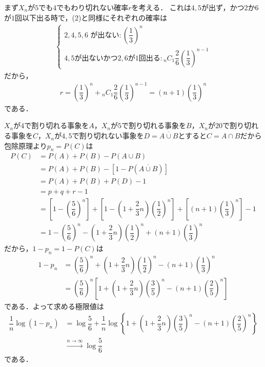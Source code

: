 \documentclass[../../main.tex]{subfiles}
\begin{document}
まず$X_n$が$5$でも$4$でもわり切れない確率$r$を考える．
これは$4, 5$が出ず，かつ$2$か$6$が$1$回以下出る時で，(2)と同様にそれぞれの確率は
\begin{align}
  \begin{cases}
    \text{$2, 4, 5, 6$ が出ない}: \left(\dfrac{1}{3}\right)^n \\
    \text{$4,5$が出ないかつ$2,6$が1回出る}: {}_n C_1 \dfrac{2}{6} \left(\dfrac{1}{3}\right)^{n-1}
  \end{cases}
\end{align}
だから，
\begin{align}
  r = \left(\dfrac{1}{3}\right)^n + {}_n C_1 \dfrac{2}{6} \left(\dfrac{1}{3}\right)^{n-1}
  = (n+1)\left(\dfrac{1}{3}\right)^n \label{eq:3}
\end{align}
である．

$X_n$が$4$で割り切れる事象を$A$，$X_n$が$5$で割り切れる事象を$B$，$X_n$が$20$で割り切れる事象を$C$，$X_n$が$4,5$で割り切れない事象を$D=\overline{A\cup B}$とすると$C=A\cap B$だから包除原理より$p_n=P(C)$は
\begin{align}
  P(C)
  &= P(A)+P(B)-P(A\cup B) \\
  &= P(A)+P(B)-\left[1-P(\overline{A\cup B})\right] \\
  &= P(A)+P(B)+P(D)-1 \\
  &= p+q+r-1 \\
  &= \left[1 - \left(\dfrac{5}{6}\right)^n\right]
  + \left[1 - \left(1+\dfrac{2}{3}n\right)\left(\dfrac{1}{2}\right)^n\right]
  + \left[(n+1)\left(\dfrac{1}{3}\right)^n\right]
  - 1 \\
  &= 1 - \left(\dfrac{5}{6}\right)^n - \left(1+\dfrac{2}{3}n\right)\left(\dfrac{1}{2}\right)^n + (n+1)\left(\dfrac{1}{3}\right)^n
\end{align}
だから，$1-p_n=1-P(C)$は
\begin{align}
  1-p_n
  &= \left(\dfrac{5}{6}\right)^n + \left(1+\dfrac{2}{3}n\right)\left(\dfrac{1}{2}\right)^n - (n+1)\left(\dfrac{1}{3}\right)^n \\
  &= \left(\dfrac{5}{6}\right)^n \left[ 1 + \left(1+\dfrac{2}{3}n\right)\left(\dfrac{3}{5}\right)^n - (n+1)\left(\dfrac{2}{5}\right)^n \right]
\end{align}
である．よって求める極限値は
\begin{align}
  \dfrac{1}{n} \log (1-p_n)
  & = \log \dfrac{5}{6} + \dfrac{1}{n} \log \left\{ 1 + \left(1+\dfrac{2}{3}n\right)\left(\dfrac{3}{5}\right)^n - (n+1)\left(\dfrac{2}{5}\right)^n \right\} \\
  &\xrightarrow{n\to\infty} \log \dfrac{5}{6}
\end{align}
である．
\end{document}
